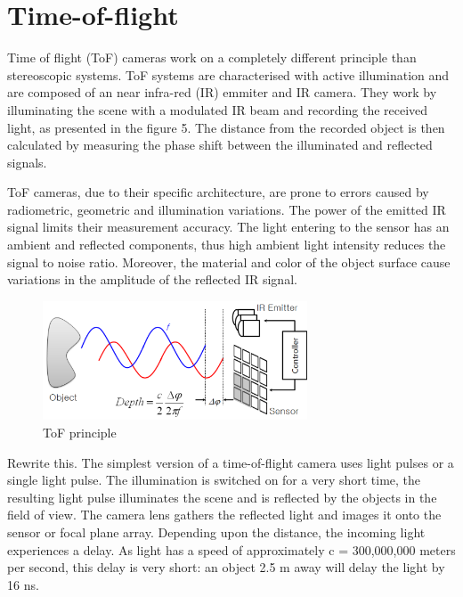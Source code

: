 \section{Time-of-flight}
\label{sec:tof}

Time of flight (ToF) cameras work on a completely different principle than stereoscopic systems. ToF systems are characterised with active illumination and are composed of an near infra-red (IR) emmiter and IR camera. They work by illuminating the scene with a modulated IR beam and recording the received light, as presented in the figure 5. The distance from the recorded object is then calculated by measuring the phase shift between the illuminated and reflected signals. 

ToF cameras, due to their specific architecture, are prone to errors caused by radiometric, geometric and illumination variations. The power of the emitted IR signal limits their measurement accuracy. The light entering to the sensor has an ambient and reflected components, thus high ambient light intensity reduces the signal to noise ratio. Moreover, the material and color of the object surface cause variations in the amplitude of the reflected IR signal.

\begin{figure}[H]
\label{fig:tof}
\centering
\includegraphics[width=0.7\textwidth]{fig/tofprinciple}
\caption{ToF principle}
\end{figure}

Rewrite this. The simplest version of a time-of-flight camera uses light pulses or a single light pulse. The illumination is switched on for a very short time, the resulting light pulse illuminates the scene and is reflected by the objects in the field of view. The camera lens gathers the reflected light and images it onto the sensor or focal plane array. Depending upon the distance, the incoming light experiences a delay. As light has a speed of approximately c = 300,000,000 meters per second, this delay is very short: an object 2.5 m away will delay the light by 16 ns.

